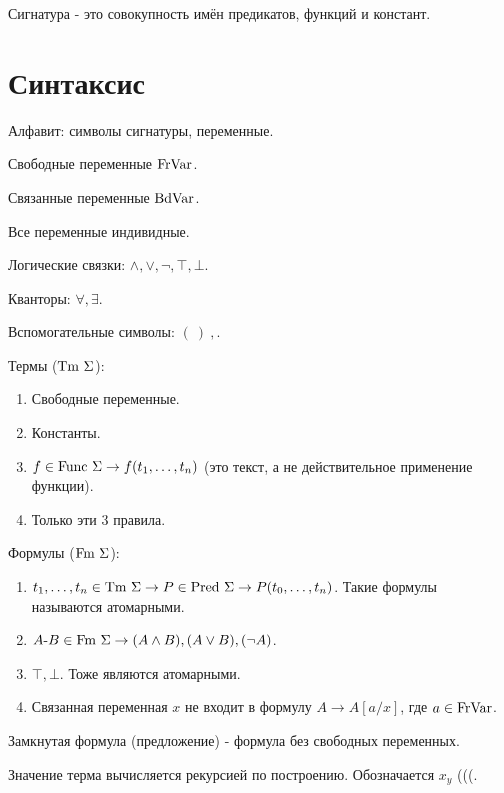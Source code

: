 \documentclass[main.tex]{subfiles}
\begin{document}
Сигнатура - это совокупность имён предикатов, функций и констант.

\section*{Синтаксис}
Алфавит: символы сигнатуры, переменные.

Свободные переменные $ \text{FrVar} $.

Связанные переменные $ \text{BdVar} $.

Все переменные индивидные.

Логические связки: $ \wedge, \vee, \neg, \top, \bot $.

Кванторы: $ \forall, \exists $.

Вспомогательные символы: $ ( \ ) \ , $.

Термы ($ \text{Tm} \ \Sigma $):
\begin{enumerate}
    \item Свободные переменные.
    \item Константы.
    \item $ f \in \text{Func} \ \Sigma  \to f(t_1, \ldots, t_n) $
        (это текст, а не действительное применение функции).
    \item Только эти 3 правила.
\end{enumerate}

Формулы ($ \text{Fm} \ \Sigma $):
\begin{enumerate}
    \item $ t_1, \ldots, t_n \in \text{Tm} \ \Sigma \to P \in \text{Pred} \ \Sigma \to
        P(t_0, \ldots, t_n) $. Такие формулы называются атомарными.
    \item $ A \text{-} B \in \text{Fm} \ \Sigma \to (A \wedge B), (A \vee B), (\neg A) $.
    \item $ \top, \bot $. Тоже являются атомарными.
    \item Связанная переменная $ x $ не входит в формулу $ A \to A[a/x] $,
        где $ a \in \text{FrVar} $.
\end{enumerate}

Замкнутая формула (предложение) - формула без свободных переменных.

Значение терма вычисляется рекурсией по построению. Обозначается $ x_y $ (((.
\end{document}
